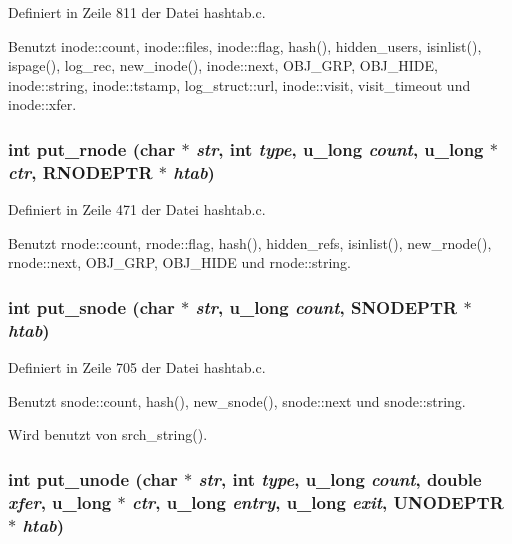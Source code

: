 Definiert in Zeile 811 der Datei hashtab.c.

Benutzt inode::count, inode::files, inode::flag, hash(), hidden\_\-users, isinlist(), ispage(), log\_\-rec, new\_\-inode(), inode::next, OBJ\_\-GRP, OBJ\_\-HIDE, inode::string, inode::tstamp, log\_\-struct::url, inode::visit, visit\_\-timeout und inode::xfer.
\subsubsection{\setlength{\rightskip}{0pt plus 5cm}int put\_\-rnode (char $\ast$ {\em str}, int {\em type}, u\_\-long {\em count}, u\_\-long $\ast$ {\em ctr}, {\bf RNODEPTR} $\ast$ {\em htab})}\label{hashtab_8c_b4002d9ddebb92b4a979361424d2e51b}




Definiert in Zeile 471 der Datei hashtab.c.

Benutzt rnode::count, rnode::flag, hash(), hidden\_\-refs, isinlist(), new\_\-rnode(), rnode::next, OBJ\_\-GRP, OBJ\_\-HIDE und rnode::string.
\subsubsection{\setlength{\rightskip}{0pt plus 5cm}int put\_\-snode (char $\ast$ {\em str}, u\_\-long {\em count}, {\bf SNODEPTR} $\ast$ {\em htab})}\label{hashtab_8c_53bf7691f858a503c77b657b22cec782}




Definiert in Zeile 705 der Datei hashtab.c.

Benutzt snode::count, hash(), new\_\-snode(), snode::next und snode::string.

Wird benutzt von srch\_\-string().
\subsubsection{\setlength{\rightskip}{0pt plus 5cm}int put\_\-unode (char $\ast$ {\em str}, int {\em type}, u\_\-long {\em count}, double {\em xfer}, u\_\-long $\ast$ {\em ctr}, u\_\-long {\em entry}, u\_\-long {\em exit}, {\bf UNODEPTR} $\ast$ {\em htab})}\label{hashtab_8c_c4f10ed3d908404570fa30fae460b7d0}




